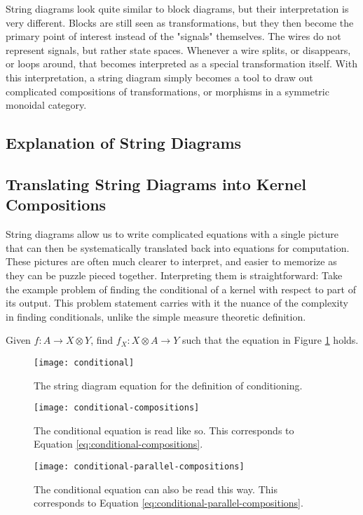 String diagrams look quite similar to block diagrams, but their interpretation is very different.
Blocks are still seen as transformations, but they then become the primary point of interest instead of the "signals" themselves.
The wires do not represent signals, but rather state spaces.
Whenever a wire splits, or disappears, or loops around, that becomes interpreted as a special transformation itself.
With this interpretation, a string diagram simply becomes a tool to draw out complicated compositions of transformations, or morphisms in a symmetric monoidal category.

\subsection{Explanation of String Diagrams}

\subsection{Translating String Diagrams into Kernel Compositions}
String diagrams allow us to write complicated equations with a single picture that can then be systematically translated back into equations for computation.
These pictures are often much clearer to interpret, and easier to memorize as they can be puzzle pieced together.
Interpreting them is straightforward: Take the example problem of finding the conditional of a kernel with respect to part of its output.
This problem statement carries with it the nuance of the complexity in finding conditionals, unlike the simple measure theoretic definition.

Given $f:A\rightarrow X\otimes Y$, find $f_X : X\otimes A \rightarrow Y$ such that the equation in Figure \ref{fig:conditional} holds.

\begin{figure}[htb]
	\centering
	\texttt{[image: conditional]}
	\caption{The string diagram equation for the definition of conditioning.}
	\label{fig:conditional}
\end{figure}

\begin{figure}[htb]
	\centering
	\texttt{[image: conditional-compositions]}
	\caption{The conditional equation is read like so. This corresponds to Equation \ref{eq:conditional-compositions}.}
	\label{fig:conditional-compositions}
\end{figure}

\begin{figure}[htb]
	\centering
	\texttt{[image: conditional-parallel-compositions]}
	\caption{The conditional equation can also be read this way. This corresponds to Equation \ref{eq:conditional-parallel-compositions}.}
	\label{fig:conditional-parallel-compositions}
\end{figure}

